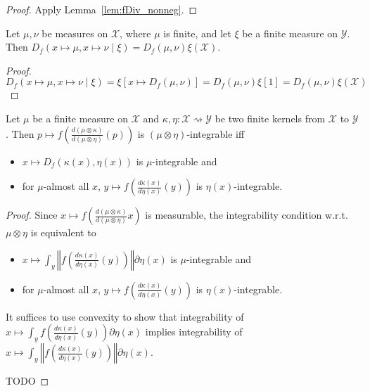 \begin{proof}\leanok
{}
Apply Lemma~\ref{lem:fDiv_nonneg}.
\end{proof}


\begin{lemma}
  \label{lem:condFDiv_const}
  \leanok
  Let $\mu, \nu$ be measures on $\mathcal X$, where $\mu$ is finite, and let $\xi$ be a finite measure on $\mathcal Y$.
  Then $D_f(x \mapsto \mu, x \mapsto \nu \mid \xi) = D_f(\mu, \nu) \xi (\mathcal X)$.
\end{lemma}

\begin{proof}\leanok
\uses{}
$$D_f(x \mapsto \mu, x \mapsto \nu \mid \xi) 
= \xi\left[x \mapsto D_f(\mu, \nu)\right] 
= D_f(\mu, \nu) \xi\left[1\right] 
= D_f(\mu, \nu) \xi (\mathcal X)$$
\end{proof}


\begin{lemma}
  \label{lem:integrable_fDiv_compProd_iff}
  \leanok
  Let $\mu$ be a finite measure on $\mathcal X$ and $\kappa, \eta : \mathcal X \rightsquigarrow \mathcal Y$ be two finite kernels from $\mathcal X$ to $\mathcal Y$.
  Then $p \mapsto f \left(\frac{d(\mu \otimes \kappa)}{d(\mu \otimes \eta)}(p)\right)$ is $(\mu \otimes \eta)$-integrable iff
  \begin{itemize}
    \item $x \mapsto D_f(\kappa(x), \eta(x))$ is $\mu$-integrable and
    \item for $\mu$-almost all $x$, $y \mapsto f \left( \frac{d\kappa(x)}{d\eta(x)}(y) \right)$ is $\eta(x)$-integrable. 
  \end{itemize}
\end{lemma}

\begin{proof}
Since $x \mapsto f \left(\frac{d(\mu \otimes \kappa)}{d(\mu \otimes \eta)} x \right)$ is measurable, the integrability condition w.r.t. $\mu \otimes \eta$ is equivalent to
\begin{itemize}
    \item $x \mapsto \int_y \left\Vert f \left( \frac{d\kappa(x)}{d\eta(x)}(y) \right) \right\Vert \partial \eta(x)$ is $\mu$-integrable and
    \item for $\mu$-almost all $x$, $y \mapsto f \left( \frac{d\kappa(x)}{d\eta(x)}(y) \right)$ is $\eta(x)$-integrable. 
  \end{itemize}
It suffices to use convexity to show that integrability of $x \mapsto \int_y f \left( \frac{d\kappa(x)}{d\eta(x)}(y) \right) \partial \eta(x)$ implies integrability of $x \mapsto \int_y \left\Vert f \left( \frac{d\kappa(x)}{d\eta(x)}(y) \right) \right\Vert \partial \eta(x)$.

TODO
\end{proof}


